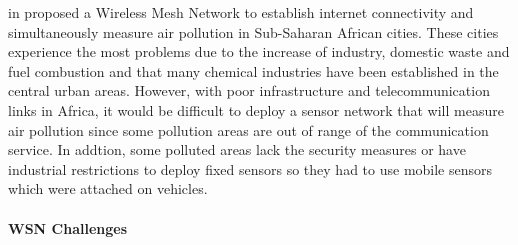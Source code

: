\citeauthor{fotuewsnpollution} in \cite{fotuewsnpollution} proposed a Wireless Mesh Network to establish internet connectivity and simultaneously measure air pollution in Sub-Saharan African cities. These cities experience the most problems due to the increase of industry, domestic waste and fuel combustion and that many chemical industries have been established in the central urban areas. However, with poor infrastructure and telecommunication links in Africa, it would be difficult to deploy a sensor network that will measure air pollution since some pollution areas are out of range of the communication service. In addtion, some polluted areas lack the security measures or have industrial restrictions to deploy fixed sensors so they had to use mobile sensors which were attached on vehicles. 

\paragraph{WSN Challenges}

